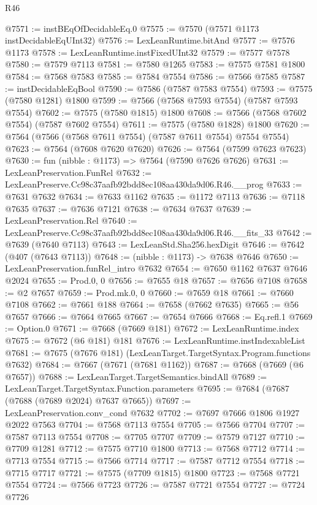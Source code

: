 \begin{lexlean}{R46}
\begin{coremodule}
@7571 := instBEqOfDecidableEq.{0}
@7575 := @7570 (@7571 @1173 instDecidableEqUInt32)
@7576 := LexLeanRuntime.bitAnd
@7577 := @7576 @1173
@7578 := LexLeanRuntime.instFixedUInt32
@7579 := @7577 @7578
@7580 := @7579 @7113
@7581 := @7580 @1265
@7583 := @7575 @7581 @1800
@7584 := @7568 @7583
@7585 := @7584 @7554
@7586 := @7566 @7585
@7587 := instDecidableEqBool
@7590 := @7586 (@7587 @7583 @7554)
@7593 := @7575 (@7580 @1281) @1800
@7599 := @7566 (@7568 @7593 @7554) (@7587 @7593 @7554)
@7602 := @7575 (@7580 @1815) @1800
@7608 := @7566 (@7568 @7602 @7554) (@7587 @7602 @7554)
@7611 := @7575 (@7580 @1828) @1800
@7620 := @7564 (@7566 (@7568 @7611 @7554) (@7587 @7611 @7554) @7554 @7554)
@7623 := @7564 (@7608 @7620 @7620)
@7626 := @7564 (@7599 @7623 @7623)
@7630 := fun (nibble : @1173) => @7564 (@7590 @7626 @7626)
@7631 := LexLeanPreservation.FunRel
@7632 := LexLeanPreserve.Cc98c37aafb92bdd8ec108aa430da9d06.R46.__prog
@7633 := @7631 @7632
@7634 := @7633 @1162
@7635 := @1172 @7113
@7636 := @7118 @7635
@7637 := @7636 @7121
@7638 := @7634 @7637
@7639 := LexLeanPreservation.Rel
@7640 := LexLeanPreserve.Cc98c37aafb92bdd8ec108aa430da9d06.R46.__fits_33
@7642 := @7639 (@7640 @7113)
@7643 := LexLeanStd.Sha256.hexDigit
@7646 := @7642 (@407 (@7643 @7113))
@7648 := (nibble : @1173) -> @7638 @7646
@7650 := LexLeanPreservation.funRel_intro @7632
@7654 := @7650 @1162 @7637 @7646 @2024
@7655 := Prod.{0, 0}
@7656 := @7655 @18
@7657 := @7656 @7108
@7658 := @2 @7657
@7659 := Prod.mk.{0, 0}
@7660 := @7659 @18
@7661 := @7660 @7108
@7662 := @7661 @188
@7664 := @7658 (@7662 @7635)
@7665 := @56 @7657
@7666 := @7664 @7665
@7667 := @7654 @7666
@7668 := Eq.refl.{1}
@7669 := Option.{0}
@7671 := @7668 (@7669 @181)
@7672 := LexLeanRuntime.index
@7675 := @7672 (@6 @181) @181
@7676 := LexLeanRuntime.instIndexableList
@7681 := @7675 (@7676 @181) (LexLeanTarget.TargetSyntax.Program.functions @7632)
@7684 := @7667 (@7671 (@7681 @1162))
@7687 := @7668 (@7669 (@6 @7657))
@7688 := LexLeanTarget.TargetSemantics.bindAll
@7689 := LexLeanTarget.TargetSyntax.Function.parameters
@7695 := @7684 (@7687 (@7688 (@7689 @2024) @7637 @7665))
@7697 := LexLeanPreservation.conv_cond @7632
@7702 := @7697 @7666 @1806 @1927 @2022 @7563
@7704 := @7568 @7113 @7554
@7705 := @7566 @7704
@7707 := @7587 @7113 @7554
@7708 := @7705 @7707
@7709 := @7579 @7127
@7710 := @7709 @1281
@7712 := @7575 @7710 @1800
@7713 := @7568 @7712
@7714 := @7713 @7554
@7715 := @7566 @7714
@7717 := @7587 @7712 @7554
@7718 := @7715 @7717
@7721 := @7575 (@7709 @1815) @1800
@7723 := @7568 @7721 @7554
@7724 := @7566 @7723
@7726 := @7587 @7721 @7554
@7727 := @7724 @7726

\end{coremodule}
\end{lexlean}

